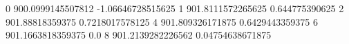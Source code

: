 0 900.0999145507812 -1.06646728515625
1 901.8111572265625 0.644775390625
2 901.88818359375 0.7218017578125
4 901.809326171875 0.6429443359375
6 901.1663818359375 0.0
8 901.2139282226562 0.04754638671875
